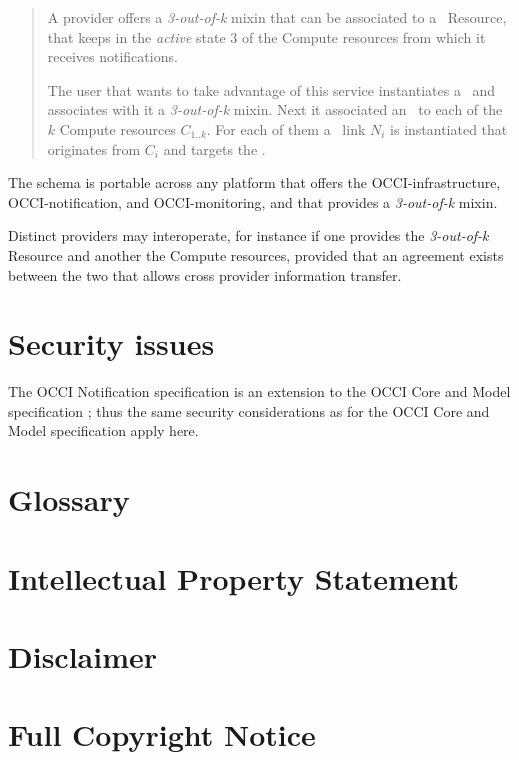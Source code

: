 \documentclass[10pt,a4paper]{article}
\begin{document}
\begin{quote}
A provider offers a {\em 3-out-of-k} mixin that can be associated to a \sens\ Resource, that keeps in the {\em active} state 3 of the Compute resources from which it receives notifications.

The user that wants to take advantage of this service instantiates a \sens\ and associates with it a {\em 3-out-of-k} mixin. Next it associated an \smx\ to each of the $k$ Compute resources $C_{1..k}$. For each of them a \ntfl\ link $N_i$ is instantiated that originates from $C_i$ and targets the \sens.
\end{quote}

The schema is portable across any platform that offers the OCCI-infrastructure, OCCI-notification, and OCCI-monitoring, and that provides a {\em 3-out-of-k} mixin.

Distinct providers may interoperate, for instance if one provides the  {\em 3-out-of-k} Resource and another the Compute resources, provided that an agreement exists between the two that allows cross provider information transfer.

\section{Security issues}
The OCCI Notification specification is an extension to the OCCI Core
and Model specification \cite{occi:core}; thus the same security
considerations as for the OCCI Core and Model specification apply
here.

\section{Glossary}
\label{sec:glossary}

 
%

\section{Intellectual Property Statement}


\section{Disclaimer}


\section{Full Copyright Notice}




\end{document}
